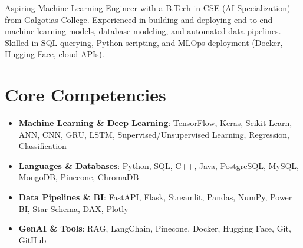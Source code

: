 \documentclass[11pt,a4paper,sans]{moderncv}
\begin{document}
\makecvtitle

\vspace{6pt}
\small{Aspiring Machine Learning Engineer with a B.Tech in CSE (AI Specialization) from Galgotias College. Experienced in building and deploying end-to-end machine learning models, database modeling, and automated data pipelines. Skilled in SQL querying, Python scripting, and MLOps deployment (Docker, Hugging Face, cloud APIs).}

\section{Core Competencies}
\vspace{1pt}
\begin{itemize}
\item \textbf{Machine Learning \& Deep Learning}: TensorFlow, Keras, Scikit-Learn, ANN, CNN, GRU, LSTM, Supervised/Unsupervised Learning, Regression, Classification
\item \textbf{Languages \& Databases}: Python, SQL, C++, Java, PostgreSQL, MySQL, MongoDB, Pinecone, ChromaDB
\item \textbf{Data Pipelines \& BI}: FastAPI, Flask, Streamlit, Pandas, NumPy, Power BI, Star Schema, DAX, Plotly
\item \textbf{GenAI \& Tools}: RAG, LangChain, Pinecone, Docker, Hugging Face, Git, GitHub
\end{itemize}
\end{document}
